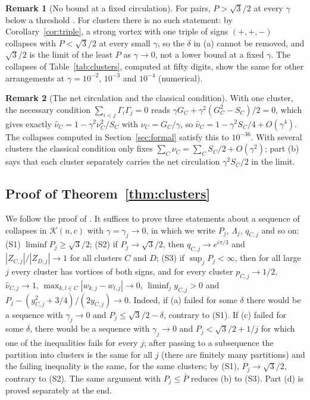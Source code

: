 \documentclass[11pt]{article}
\theoremstyle{definition}
\newtheorem{remark}{Remark}
\newcommand{\K}{\mathcal{K}}
\newcommand{\hnu}{\widehat{\nu}}
\begin{document}
\begin{remark}[No bound at a fixed circulation]\label{rem:nobound}
For pairs, $P > \sqrt{3}/2$ at every $\gamma$ below a threshold \cite[Proposition~4]{mw2026}. For clusters there is no such statement: by Corollary~\ref{cor:triple}, a strong vortex with one triple of signs $(+,+,-)$ collapses with $P < \sqrt{3}/2$ at every small $\gamma$, so the $\delta$ in (a) cannot be removed, and $\sqrt{3}/2$ is the limit of the least $P$ as $\gamma \to 0$, not a lower bound at a fixed $\gamma$. The collapses of Table~\ref{tab:clusters}, computed at fifty digits, show the same for other arrangements at $\gamma = 10^{-2}$, $10^{-3}$ and $10^{-4}$ (numerical).
\end{remark}

\begin{remark}[The net circulation and the classical condition]\label{rem:harmonic}
With one cluster, the necessary condition $\sum_{i<j}\Gamma_i\Gamma_j = 0$ reads $\gamma G_C + \gamma^2(G_C^2 - S_C)/2 = 0$, which gives exactly $\hnu_C = 1 - \gamma^2\nu_C^2/S_C$ with $\nu_C = G_C/\gamma$, so $\hnu_C = 1 - \gamma^2 S_C/4 + O(\gamma^4)$. The collapses computed in Section~\ref{sec:formal} satisfy this to $10^{-36}$. With several clusters the classical condition only fixes $\sum_C \nu_C = \sum_C S_C/2 + O(\gamma^2)$; part (b) says that each cluster separately carries the net circulation $\gamma^2 S_C/2$ in the limit.
\end{remark}

\subsection{Proof of Theorem~\ref{thm:clusters}}

We follow the proof of \cite[Theorem~3]{mw2026}. It suffices to prove three statements about a sequence of collapses in $\K(n, c)$ with $\gamma = \gamma_j \to 0$, in which we write $P_j$, $\Lambda_j$, $q_{C,j}$ and so on:
(S1) $\liminf P_j \ge \sqrt{3}/2$;
(S2) if $P_j \to \sqrt{3}/2$, then $q_{C,j} \to e^{i\pi/3}$ and $|Z_{C,j}|/|Z_{D,j}| \to 1$ for all clusters $C$ and $D$;
(S3) if $\sup_j P_j < \infty$, then for all large $j$ every cluster has vortices of both signs, and for every cluster $p_{C,j} \to 1/2$, $\hnu_{C,j} \to 1$, $\max_{k,l \in C}|w_{k,j} - w_{l,j}| \to 0$, $\liminf_j y_{C,j} > 0$ and $P_j - (y_{C,j}^2 + 3/4)/(2y_{C,j}) \to 0$.
Indeed, if (a) failed for some $\delta$ there would be a sequence with $\gamma_j \to 0$ and $P_j \le \sqrt{3}/2 - \delta$, contrary to (S1). If (c) failed for some $\delta$, there would be a sequence with $\gamma_j \to 0$ and $P_j < \sqrt{3}/2 + 1/j$ for which one of the inequalities fails for every $j$; after passing to a subsequence the partition into clusters is the same for all $j$ (there are finitely many partitions) and the failing inequality is the same, for the same clusters; by (S1), $P_j \to \sqrt{3}/2$, contrary to (S2). The same argument with $P_j \le \bar P$ reduces (b) to (S3). Part (d) is proved separately at the end.
\end{document}
